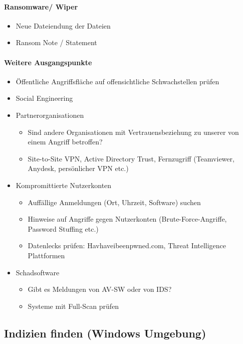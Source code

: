 \paragraph{Ransomware/ Wiper}
\begin{itemize}
    \item Neue Dateiendung der Dateien
    \item Ransom Note / Statement
\end{itemize}

\paragraph{Weitere Ausgangspunkte}
\begin{itemize}
    \item Öffentliche Angriffsfläche auf offensichtliche Schwachstellen prüfen
    \item Social Engineering
    \item Partnerorganisationen
    \begin{itemize}
        \item Sind andere Organisationen mit Vertrauensbeziehung zu unserer von einem Angriff betroffen?
        \item Site-to-Site VPN, Active Directory Trust, Fernzugriff (Teamviewer, Anydesk, persönlicher VPN etc.)
    \end{itemize}
    \item Kompromittierte Nutzerkonten
    \begin{itemize}
        \item Auffällige Anmeldungen (Ort, Uhrzeit, Software) suchen
        \item Hinweise auf Angriffe gegen Nutzerkonten (Brute-Force-Angriffe, Password Stuffing etc.)
        \item Datenlecks prüfen: Havhaveibeenpwned.com, Threat Intelligence Plattformen
    \end{itemize}
    \item Schadsoftware
    \begin{itemize}
        \item Gibt es Meldungen von AV-SW oder von IDS?
        \item Systeme mit Full-Scan prüfen
    \end{itemize}
\end{itemize}

\subsection{Indizien finden (Windows Umgebung)}

